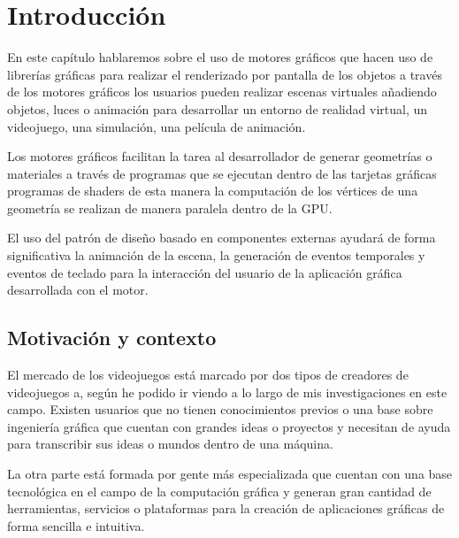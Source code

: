 \documentclass[a4paper, 17pt]{book}
\begin{document}
\cleardoublepage
\chapter{Introducción}
\label{sec:intro} %

En este capítulo hablaremos sobre el uso de motores gráficos que hacen uso de librerías gráficas 
para realizar el renderizado por pantalla de los objetos a través de los motores gráficos los usuarios 
pueden realizar escenas virtuales añadiendo objetos, luces o animación para desarrollar un entorno 
de realidad virtual, un videojuego, una simulación, una película de animación.

\vspace{1mm} %

Los motores gráficos facilitan la tarea al desarrollador de generar geometrías o materiales a 
través de programas que se ejecutan dentro de las tarjetas gráficas programas de shaders de esta
manera la computación de los vértices de una geometría se realizan de manera paralela dentro de la GPU.

\vspace{1mm} %

El uso del patrón de diseño basado en componentes externas ayudará de forma significativa la animación 
de la escena, la generación de eventos temporales y eventos de teclado para la interacción del usuario 
de la aplicación gráfica desarrollada con el motor.

\section{Motivación y contexto}
\label{sec:}

El mercado de los videojuegos está marcado por dos tipos de creadores de videojuegos a, según he podido ir 
viendo a lo largo de mis investigaciones en este campo. Existen usuarios que no tienen conocimientos 
previos o una base sobre ingeniería gráfica que cuentan con grandes ideas o proyectos y necesitan de
ayuda para transcribir sus ideas o mundos dentro de una máquina. 

\vspace{1mm} %

La otra parte está formada por gente más especializada que cuentan con una base tecnológica en el campo 
de la computación gráfica y generan gran cantidad de herramientas, servicios o plataformas para la 
creación de aplicaciones gráficas de forma sencilla e intuitiva. 
\end{document}
